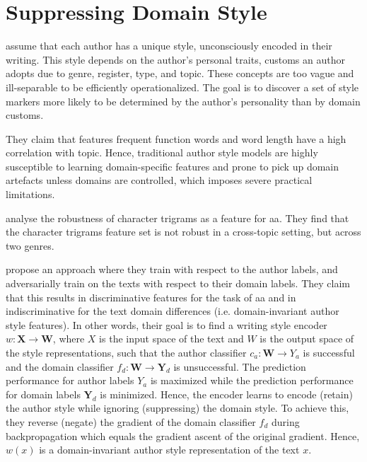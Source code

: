 \section{Suppressing Domain Style}

\citet{bischoff_importance_2020} assume that each author has a unique style, unconsciously encoded in their writing.
This style depends on the author's personal traits, customs an author adopts due to genre, register, type, and topic.
These concepts are too vague and ill-separable to be efficiently operationalized.
The goal is to discover a set of style markers more likely to be determined by the author's personality than by domain customs.

They claim that features frequent function words and word length have a high correlation with topic. 
Hence, traditional author style models are highly susceptible to learning domain-specific features and 
prone to pick up domain artefacts unless domains are controlled, 
which imposes severe practical limitations.

\citet{bischoff_importance_2020} analyse the robustness of character trigrams as a feature for \ac{aa}.
They find that the character trigrams feature set is not robust in a cross-topic setting, but across two genres.

\citet{bischoff_importance_2020} propose an approach where they train with respect to the author labels, 
and adversarially train on the texts with respect to their domain labels.
They claim that this results in discriminative features for the task of \ac{aa} and in 
indiscriminative for the text domain differences (i.e. domain-invariant author style features).
In other words, their goal is to find a writing style encoder $w: \textbf{X} \to \textbf{W}$, 
where $X$ is the input space of the text and $W$ is the output space of the style representations, 
such that the author classifier $c_a: \textbf{W} \to Y_a$ is successful and 
the domain classifier $f_d: \textbf{W} \to \textbf{Y}_d$ is unsuccessful.
The prediction performance for author labels $Y_a$ is maximized while the 
prediction performance for domain labels $\textbf{Y}_d$ is minimized.
Hence, the encoder learns to encode (retain) the author style while ignoring (suppressing) the domain style.
To achieve this, they reverse (negate) the gradient of the domain classifier $f_d$ during backpropagation 
which equals the gradient ascent of the original gradient.
Hence, $w(x)$ is a domain-invariant author style representation of the text $x$. 


